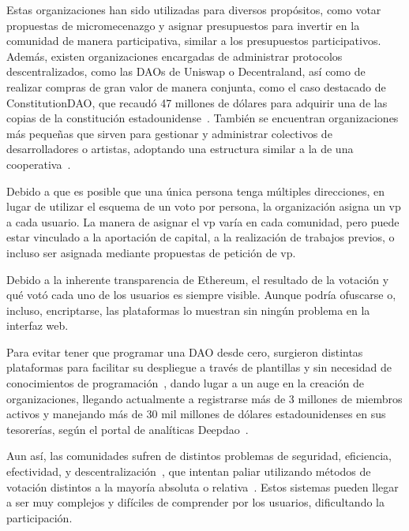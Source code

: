 Estas organizaciones han sido utilizadas para diversos propósitos, como votar propuestas de micromecenazgo y asignar presupuestos para invertir en la comunidad de manera participativa, similar a los presupuestos participativos. Además, existen organizaciones encargadas de administrar protocolos descentralizados, como las DAOs de Uniswap o Decentraland, así como de realizar compras de gran valor de manera conjunta, como el caso destacado de ConstitutionDAO, que recaudó 47 millones de dólares para adquirir una de las copias de la constitución estadounidense~\cite{kastrenakes_crypto_2021}. También se encuentran organizaciones más pequeñas que sirven para gestionar y administrar colectivos de desarrolladores o artistas, adoptando una estructura similar a la de una cooperativa~\cite{pena-calvin_categorization_2023}.

Debido a que es posible que una única persona tenga múltiples direcciones, en lugar de utilizar el esquema de un voto por persona, la organización asigna un \gls{vp} a cada usuario. La manera de asignar el \gls{vp} varía en cada comunidad, pero puede estar vinculado a la aportación de capital, a la realización de trabajos previos, o incluso ser asignada mediante propuestas de petición de \gls{vp}.

Debido a la inherente transparencia de Ethereum, el resultado de la votación y qué votó cada uno de los usuarios es siempre visible. Aunque podría ofuscarse o, incluso, encriptarse, las plataformas lo muestran sin ningún problema en la interfaz web.

Para evitar tener que programar una DAO desde cero, surgieron distintas plataformas para facilitar su despliegue a través de plantillas y sin necesidad de conocimientos de programación~\cite{faqir-rhazoui_comparative_2021}, dando lugar a un auge en la creación de organizaciones, llegando actualmente a registrarse más de 3 millones de miembros activos y manejando más de 30 mil millones de dólares estadounidenses en sus tesorerías, según el portal de analíticas Deepdao~\cite{deepdao_ventures_ltd_deepdao_2023}.

Aun así, las comunidades sufren de distintos problemas de seguridad, eficiencia, efectividad, y descentralización~\cite{buterin_governance_2018,buterin_moving_2021}, que intentan paliar utilizando métodos de votación distintos a la mayoría absoluta o relativa~\cite{fan_insight_2023}. Estos sistemas pueden llegar a ser muy complejos y difíciles de comprender por los usuarios, dificultando la participación.


